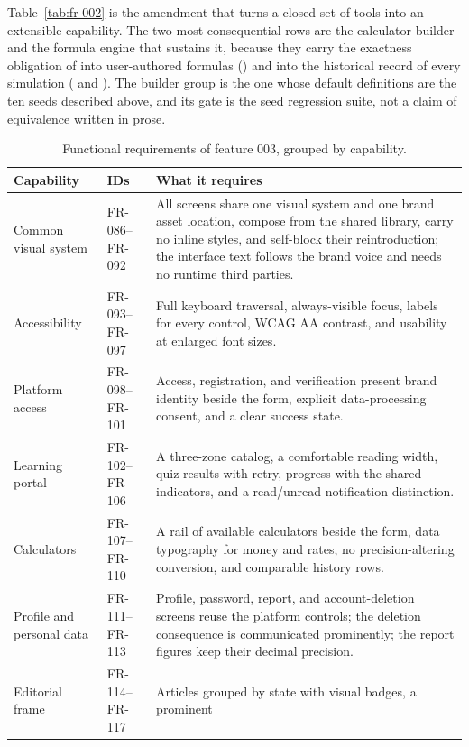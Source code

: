 Table~\ref{tab:fr-002} is the amendment that turns a closed set of tools into an extensible
capability. The two most consequential rows are the calculator builder and the formula engine that
sustains it, because they carry the exactness obligation of  into user-authored
formulas () and into the historical record of every simulation ( and
). The builder group is the one whose default definitions are the ten seeds described
above, and its gate is the seed regression suite, not a claim of equivalence written in prose.

\begin{table}[htbp]
  \centering
  \caption{Functional requirements of feature 003, grouped by capability.}
  \label{tab:fr-003}
  \begin{tabular}{@{}p{3.6cm}p{3.4cm}p{9.4cm}@{}}
    \hline
    Capability & IDs & What it requires \\
    \hline
    Common visual system & FR-086--FR-092 & All screens share one visual system and one brand
    asset location, compose from the shared library, carry no inline styles, and self-block their
    reintroduction; the interface text follows the brand voice and needs no runtime third parties. \\
    Accessibility & FR-093--FR-097 & Full keyboard traversal, always-visible focus, labels for
    every control, WCAG AA contrast, and usability at enlarged font sizes. \\
    Platform access & FR-098--FR-101 & Access, registration, and verification present brand
    identity beside the form, explicit data-processing consent, and a clear success state. \\
    Learning portal & FR-102--FR-106 & A three-zone catalog, a comfortable reading width, quiz
    results with retry, progress with the shared indicators, and a read/unread notification
    distinction. \\
    Calculators & FR-107--FR-110 & A rail of available calculators beside the form, data typography
    for money and rates, no precision-altering conversion, and comparable history rows. \\
    Profile and personal data & FR-111--FR-113 & Profile, password, report, and account-deletion
    screens reuse the platform controls; the deletion consequence is communicated prominently; the
    report figures keep their decimal precision. \\
    Editorial frame & FR-114--FR-117 & Articles grouped by state with visual badges, a prominent

\end{tabular}
\end{table}
